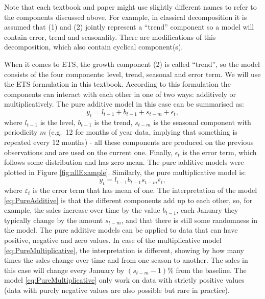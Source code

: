 \documentclass[
]{book}
\theoremstyle{definition}
\theoremstyle{definition}
\theoremstyle{definition}
\theoremstyle{definition}
\theoremstyle{remark}
\begin{document}
Note that each textbook and paper might use slightly different names to refer to the components discussed above. For example, in classical decomposition \citep{Persons1919} it is assumed that (1) and (2) jointly represent a ``trend'' component so a model will contain error, trend and seasonality. There are modifications of this decomposition, which also contain cyclical component(s).

When it comes to ETS, the growth component (2) is called ``trend'', so the model consists of the four components: level, trend, seasonal and error term. We will use the ETS formulation in this textbook. According to this formulation the components can interact with each other in one of two ways: additively or multiplicatively. The pure additive model in this case can be summarised as:
\begin{equation}
    y_t = l_{t-1} + b_{t-1} + s_{t-m} + \epsilon_t ,
    \label{eq:PureAdditive}
\end{equation}
where \(l_{t-1}\) is the level, \(b_{t-1}\) is the trend, \(s_{t-m}\) is the seasonal component with periodicity \(m\) (e.g.~12 for months of year data, implying that something is repeated every 12 months) - all these components are produced on the previous observations and are used on the current one. Finally, \(\epsilon_t\) is the error term, which follows some distribution and has zero mean. The pure additive models were plotted in Figure \ref{fig:allExample}. Similarly, the pure multiplicative model is:
\begin{equation}
    y_t = l_{t-1} b_{t-1} s_{t-m} \varepsilon_t ,
    \label{eq:PureMultiplicative}
\end{equation}
where \(\varepsilon_t\) is the error term that has mean of one. The interpretation of the model \eqref{eq:PureAdditive} is that the different components add up to each other, so, for example, the sales increase over time by the value \(b_{t-1}\), each January they typically change by the amount \(s_{t-m}\), and that there is still some randomness in the model. The pure additive models can be applied to data that can have positive, negative and zero values. In case of the multiplicative model \eqref{eq:PureMultiplicative}, the interpretation is different, showing by how many times the sales change over time and from one season to another. The sales in this case will change every January by \((s_{t-m}-1)\)\% from the baseline. The model \eqref{eq:PureMultiplicative} only work on data with strictly positive values (data with purely negative values are also possible but rare in practice).
\end{document}
